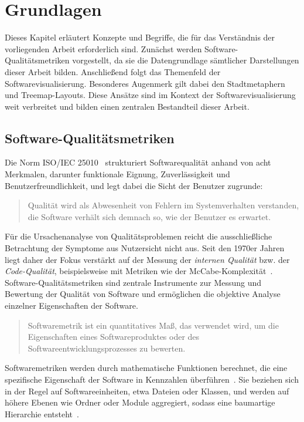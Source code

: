 \chapter{Grundlagen} \label{sec:Grundlagen}

Dieses Kapitel erläutert Konzepte und Begriffe, die für das Verständnis der vorliegenden Arbeit erforderlich sind. Zunächst werden Software-Qualitätsmetriken vorgestellt, da sie die Datengrundlage sämtlicher Darstellungen dieser Arbeit bilden. Anschließend folgt das Themenfeld der Softwarevisualisierung. Besonderes Augenmerk gilt dabei den Stadtmetaphern und Treemap-Layouts. Diese Ansätze sind im Kontext der Softwarevisualisierung weit verbreitet und bilden einen zentralen Bestandteil dieser Arbeit.

\section{Software-Qualitätsmetriken} \label{sec:SoftwareQualitaetsmetriken}

Die Norm ISO/IEC 25010~\cite{iso25010_2024} strukturiert Softwarequalität anhand von acht Merkmalen, darunter funktionale Eignung, Zuverlässigkeit und Benutzerfreundlichkeit, und legt dabei die Sicht der Benutzer zugrunde:
\begin{quote}
    Qualität wird als Abwesenheit von Fehlern im Systemverhalten verstanden, die Software verhält sich demnach so, wie der Benutzer es erwartet.~\cite[1]{Witte2018}
\end{quote}

Für die Ursachenanalyse von Qualitätsproblemen reicht die ausschließliche Betrachtung der Symptome aus Nutzersicht nicht aus. Seit den 1970er Jahren liegt daher der Fokus verstärkt auf der Messung der \textit{internen Qualität} bzw. der \textit{Code-Qualität}, beispielsweise mit Metriken wie der McCabe-Komplexität~\cite{ludewig}. Software-Qualitätsmetriken sind zentrale Instrumente zur Messung und Bewertung der Qualität von Software und ermöglichen die objektive Analyse einzelner Eigenschaften der Software.

\begin{quote}
    Softwaremetrik ist ein quantitatives Maß, das verwendet wird, um die Eigenschaften eines Softwareproduktes oder des Softwareentwicklungsprozesses zu bewerten.~\cite{softwaremetriken_2019}
\end{quote}

Softwaremetriken werden durch mathematische Funktionen berechnet, die eine spezifische Eigenschaft der Software in Kennzahlen überführen~\cite{wikipedia_softwaremetrik, def_qual_metric}. Sie beziehen sich in der Regel auf Softwareeinheiten, etwa Dateien oder Klassen, und werden auf höhere Ebenen wie Ordner oder Module aggregiert, sodass eine baumartige Hierarchie entsteht~\cite{code_charta_wiki_ana, sonarqube_2025}.

